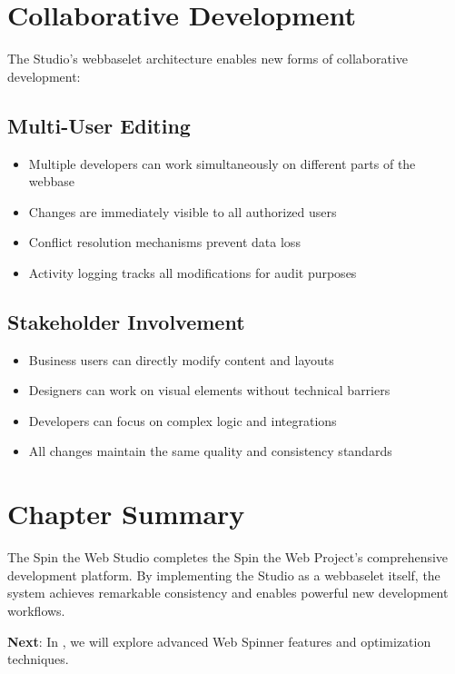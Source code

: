 \section{Collaborative Development}

The Studio's webbaselet architecture enables new forms of collaborative development:

\subsection{Multi-User Editing}

\begin{itemize}
\item Multiple developers can work simultaneously on different parts of the webbase
\item Changes are immediately visible to all authorized users
\item Conflict resolution mechanisms prevent data loss
\item Activity logging tracks all modifications for audit purposes
\end{itemize}

\subsection{Stakeholder Involvement}

\begin{itemize}
\item Business users can directly modify content and layouts
\item Designers can work on visual elements without technical barriers
\item Developers can focus on complex logic and integrations
\item All changes maintain the same quality and consistency standards
\end{itemize}

\section{Chapter Summary}

The Spin the Web Studio completes the Spin the Web Project's comprehensive development platform. By implementing the Studio as a webbaselet itself, the system achieves remarkable consistency and enables powerful new development workflows.

\textbf{Next}: In , we will explore advanced Web Spinner features and optimization techniques.
